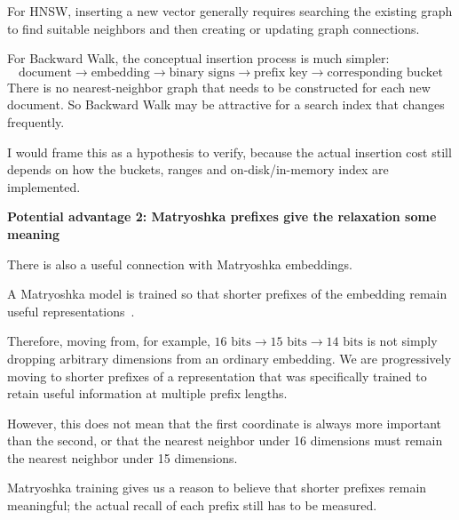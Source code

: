 For HNSW, inserting a new vector generally requires searching the existing graph to find
suitable neighbors and then creating or updating graph connections.

For Backward Walk, the conceptual insertion process is much simpler:
\[
\text{document}\to\text{embedding}\to\text{binary signs}\to\text{prefix key}\to\text{corresponding bucket}
\]
There is no nearest-neighbor graph that needs to be constructed for each new document.
So Backward Walk may be attractive for a search index that changes frequently.

I would frame this as a hypothesis to verify, because the actual insertion cost still
depends on how the buckets, ranges and on-disk/in-memory index are implemented.

\textbf{Potential advantage 2: Matryoshka prefixes give the relaxation some meaning}\par
There is also a useful connection with Matryoshka embeddings.

A Matryoshka model is trained so that shorter prefixes of the embedding remain useful
representations~\cite{mrl}.

Therefore, moving from, for example, $16\text{ bits}\to15\text{ bits}\to14\text{ bits}$
is not simply dropping arbitrary dimensions from an ordinary embedding. We are progressively
moving to shorter prefixes of a representation that was specifically trained to retain
useful information at multiple prefix lengths.

However, this does not mean that the first coordinate is always more important than the
second, or that the nearest neighbor under 16 dimensions must remain the nearest neighbor
under 15 dimensions.

Matryoshka training gives us a reason to believe that shorter prefixes remain meaningful;
the actual recall of each prefix still has to be measured.
